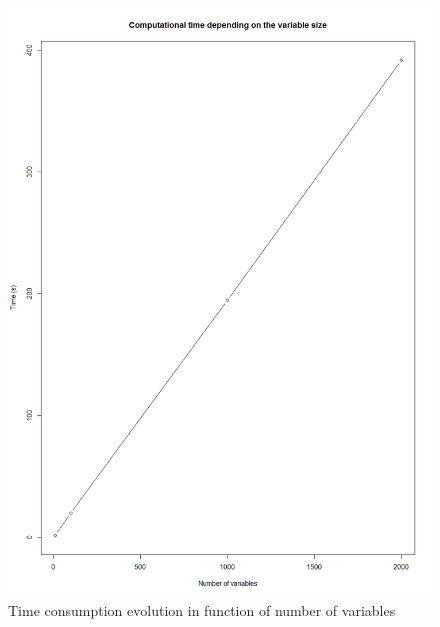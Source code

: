 \documentclass[twocolumn,12pt]{article}
\begin{document}
\begin{figure}[!]
    \centering
    \includegraphics[scale=0.3]{img/VarTime.png}
    \caption{Time consumption evolution in function of number of variables}
    \label{fig:tpsVar}
\end{figure}
\end{document}
